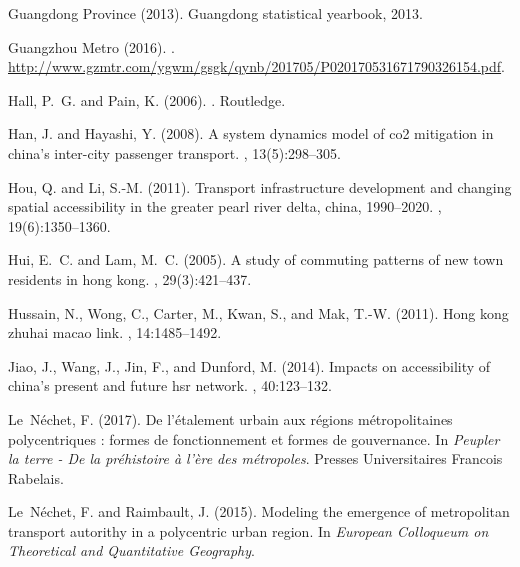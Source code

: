 \begin{thebibliography}{}
{Guangdong Province} (2013).
\newblock Guangdong statistical yearbook, 2013.

{Guangzhou Metro} (2016).
.
\newblock
  \url{http://www.gzmtr.com/ygwm/gsgk/qynb/201705/P020170531671790326154.pdf}.

Hall, P.~G. and Pain, K. (2006).
.
\newblock Routledge.

Han, J. and Hayashi, Y. (2008).
\newblock A system dynamics model of co2 mitigation in china’s inter-city
  passenger transport.
,
  13(5):298--305.

Hou, Q. and Li, S.-M. (2011).
\newblock Transport infrastructure development and changing spatial
  accessibility in the greater pearl river delta, china, 1990--2020.
, 19(6):1350--1360.

Hui, E.~C. and Lam, M.~C. (2005).
\newblock A study of commuting patterns of new town residents in hong kong.
, 29(3):421--437.

Hussain, N., Wong, C., Carter, M., Kwan, S., and Mak, T.-W. (2011).
\newblock Hong kong zhuhai macao link.
, 14:1485--1492.

Jiao, J., Wang, J., Jin, F., and Dunford, M. (2014).
\newblock Impacts on accessibility of china's present and future hsr network.
, 40:123--132.

Le~N{\'e}chet, F. (2017).
\newblock De l'{\'e}talement urbain aux r{\'e}gions m{\'e}tropolitaines
  polycentriques : formes de fonctionnement et formes de gouvernance.
\newblock In {\em {Peupler la terre - De la pr{\'e}histoire {\`a} l'{\`e}re des
  m{\'e}tropoles}}. Presses Universitaires Francois Rabelais.

Le~N{\'e}chet, F. and Raimbault, J. (2015).
\newblock Modeling the emergence of metropolitan transport autorithy in a
  polycentric urban region.
\newblock In {\em European Colloqueum on Theoretical and Quantitative
  Geography}.


\end{thebibliography}
